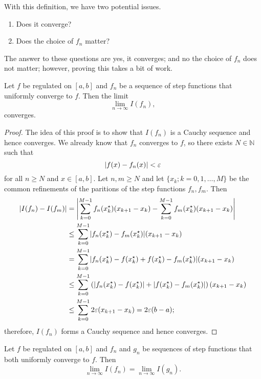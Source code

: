 \begin{remark}
    With this definition, we have two potential issues.
    \begin{enumerate}
        \item Does it converge?
        \item Does the choice of $f_n$ matter?
    \end{enumerate}

    The answer to these questions are yes, it converges; and no the choice of $f_n$ does not matter; however, proving this takes a bit of work.
\end{remark}

\begin{lemma}
    Let $f$ be regulated on $[a,b]$ and $f_n$ be a sequence of step functions that uniformly converge to $f$. Then the limit \[ \lim_{n \to \infty} I(f_n), \] converges.
\end{lemma}

\begin{proof}
    The idea of this proof is to show that $I(f_n)$ is a Cauchy sequence and hence converges. We already know that $f_n$ converges to $f$, so there exists $N \in \mathbb N$ such that \[ \lvert f(x) - f_n(x)\rvert < \varepsilon \] for all $n \geq N$ and $x \in [a, b]$. Let $n, m \geq N$ and let $\{ x_k; k = 0, 1, \ldots, M \}$ be the common refinements of the paritions of the step functions $f_n, f_m$. Then
    \begin{align*}
        \lvert I(f_n) - I(f_m)\rvert &= \left\lvert \sum_{k = 0}^{M - 1} f_n(x^{\star}_k) (x_{k + 1} - x_{k}) - \sum_{k = 0}^{M - 1} f_m(x^{\star}_k) (x_{k + 1} - x_{k}) \right\rvert \\
        &\leq \sum_{k = 0}^{M - 1} \lvert f_n(x^{\star}_k) - f_m(x^{\star}_k)\rvert (x_{k + 1} - x_k) \\
        &= \sum_{k = 0}^{M - 1} \lvert f_n(x^{\star}_k) - f(x^{\star}_k) + f(x^{\star}_k) - f_m(x^{\star}_k)\rvert (x_{k + 1} - x_k) \\
        &\leq \sum_{k = 0}^{M - 1} \left( \lvert f_n(x^{\star}_k )- f(x^{\star}_k)\rvert + \lvert f(x^{\star}_k) - f_m(x^{\star}_k)\rvert \right) (x_{k + 1} - x_k) \\
        &\leq \sum_{k = 0}^{M - 1} 2 \varepsilon (x_{k + 1} - x_k) = 2 \varepsilon (b - a);
    \end{align*}
    therefore, $I(f_n)$ forms a Cauchy sequence and hence converges.
\end{proof}

\begin{lemma}
    Let $f$ be regulated on $[a,b]$ and $f_n$ and $g_n$ be sequences of step functions that both uniformly converge to $f$. Then \[ \lim_{n \to \infty} I(f_n) = \lim_{n \to \infty} I(g_n). \]
\end{lemma}

